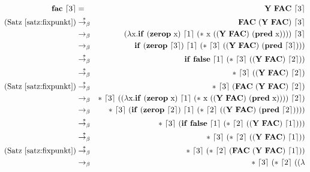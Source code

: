 \begin{figure}[!t]
  \begin{center}
    \scriptsize
    \begin{eqnarray*}
    \mathbf{fac}~\lceil 3\rceil &=& \mathbf{Y}~\mathbf{FAC}~\lceil 3\rceil\\
    \text{(Satz~\ref{satz:fixpunkt})} &\overset{\ast}{\rightarrow_{\beta}}&
    \mathbf{FAC}~(\mathbf{Y}~\mathbf{FAC})~\lceil 3\rceil\\
    &\rightarrow_{\beta}&
    (\lambda \lrm x.\mathbf{if}~(\mathbf{zerop}~\lrm x)~\lceil 1\rceil~(\ast~\lrm x~((\mathbf{Y}~\mathbf{FAC})~(\mathbf{pred}~\lrm x))))~\lceil 3\rceil\\
    &\rightarrow_{\beta}&
    \mathbf{if}~(\mathbf{zerop}~ \lceil 3\rceil)~\lceil 1\rceil~(\ast~\lceil 3\rceil~((\mathbf{Y}~\mathbf{FAC})~(\mathbf{pred}~\lceil 3\rceil)))
    \\
    &\overset{\ast}{\rightarrow_{\beta}}&
    \mathbf{if}~\mathbf{false}~\lceil 1\rceil~(\ast~\lceil 3\rceil~((\mathbf{Y}~\mathbf{FAC})~\lceil 2\rceil))\\
    &\overset{\ast}{\rightarrow_{\beta}}&
    \ast~\lceil 3\rceil~((\mathbf{Y}~\mathbf{FAC})~\lceil 2\rceil)\\
    \text{(Satz~\ref{satz:fixpunkt})} &\overset{\ast}{\rightarrow_{\beta}}&
    \ast~\lceil 3\rceil~(\mathbf{FAC}~(\mathbf{Y}~\mathbf{FAC})~\lceil 2\rceil)\\
    &\rightarrow_{\beta}&
    \ast~\lceil 3\rceil~((\lambda
    \lrm x.\mathbf{if}~(\mathbf{zerop}~\lrm x)~\lceil 1\rceil~(\ast~\lrm x~((\mathbf{Y}~\mathbf{FAC})~(\mathbf{pred}~\lrm x))))~\lceil 2\rceil)\\
    &\rightarrow_{\beta}&
    \ast~\lceil 3\rceil~(\mathbf{if}~(\mathbf{zerop}~ \lceil 2\rceil)~\lceil 1\rceil~(\ast~\lceil 2\rceil~((\mathbf{Y}~\mathbf{FAC})~(\mathbf{pred}~\lceil 2\rceil))))\\
    &\overset{\ast}{\rightarrow_{\beta}}&
    \ast~\lceil 3\rceil~(\mathbf{if}~\mathbf{false}~\lceil 1\rceil~(\ast~\lceil 2\rceil~((\mathbf{Y}~\mathbf{FAC})~\lceil 1\rceil)))\\
    &\overset{\ast}{\rightarrow_{\beta}}&
    \ast~\lceil 3\rceil~(\ast~\lceil 2\rceil~((\mathbf{Y}~\mathbf{FAC})~\lceil 1\rceil))\\
    \text{(Satz~\ref{satz:fixpunkt})} &\overset{\ast}{\rightarrow_{\beta}}&
    \ast~\lceil 3\rceil~(\ast~\lceil 2\rceil~(\mathbf{FAC}~(\mathbf{Y}~\mathbf{FAC})~\lceil 1\rceil))\\
    &\rightarrow_{\beta}&
    \ast~\lceil 3\rceil~(\ast~\lceil 2\rceil~((\lambda

\end{eqnarray*}
\end{center}
\end{figure}
